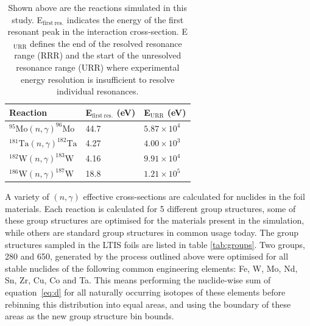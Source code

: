 \begin{table}[H]
  \centering
  \begin{tabu} to \textwidth {X[3] X X}
    \toprule
    Reaction                                       & E$_\mathrm{first\ res.}$ (eV) & E$_\mathrm{URR}$ (eV) \\ 
    \midrule
    $^{95}\mathrm{Mo}(n,\gamma)^{96}\mathrm{Mo}$   & 44.7       & $5.87\times10^{4}$      \\
    $^{181}\mathrm{Ta}(n,\gamma)^{182}\mathrm{Ta}$ & 4.27       & $4.00\times10^{3}$      \\
    $^{182}\mathrm{W}(n,\gamma)^{183}\mathrm{W}$   & 4.16       & $9.91\times10^{4}$      \\
    $^{186}\mathrm{W}(n,\gamma)^{187}\mathrm{W}$   & 18.8       & $1.21\times10^{5}$      \\ 
    \bottomrule
  \end{tabu}
  \caption{Shown above are the reactions simulated in this study. E$_\mathrm{first\ res.}$ indicates the energy of the first resonant peak in the interaction cross-section. E$_\mathrm{URR}$ defines the end of the resolved resonance range (RRR) and the start of the unresolved resonance range (URR) where experimental energy resolution is insufficient to resolve individual resonances.}
  \label{tab:reactions}
\end{table}

A variety of $(n,\gamma)$ effective cross-sections are calculated for nuclides in the foil materials. Each reaction is calculated for 5 different group structures, some of these group structures are optimised for the materials present in the simulation, while others are standard group structures in common usage today. The group structures sampled in the LTIS foils are listed in table \ref{tab:groups}. Two groups, 280 and 650, generated by the process outlined above were optimised for all stable nuclides of the following common engineering elements: Fe, W, Mo, Nd, Sn, Zr, Cu, Co and Ta. This means performing the nuclide-wise sum of equation~\ref{eq:d} for all naturally occurring isotopes of these elements before rebinning this distribution into equal areas, and using the boundary of these areas as the new group structure bin bounds.

